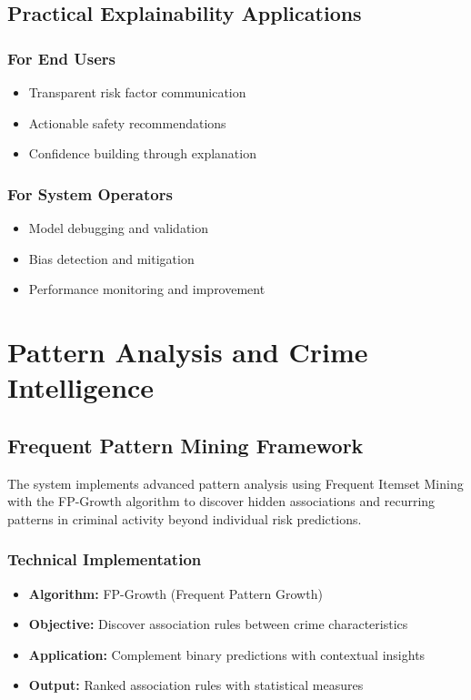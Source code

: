 \documentclass[11pt]{article}
\begin{document}
\subsection{Practical Explainability Applications}

\subsubsection{For End Users}
\begin{itemize}[leftmargin=*]
\item Transparent risk factor communication
\item Actionable safety recommendations
\item Confidence building through explanation
\end{itemize}

\subsubsection{For System Operators}
\begin{itemize}[leftmargin=*]
\item Model debugging and validation
\item Bias detection and mitigation
\item Performance monitoring and improvement
\end{itemize}

\section{Pattern Analysis and Crime Intelligence}

\subsection{Frequent Pattern Mining Framework}
The system implements advanced pattern analysis using Frequent Itemset Mining with the FP-Growth algorithm to discover hidden associations and recurring patterns in criminal activity beyond individual risk predictions.

\subsubsection{Technical Implementation}
\begin{itemize}[leftmargin=*]
\item \textbf{Algorithm:} FP-Growth (Frequent Pattern Growth)
\item \textbf{Objective:} Discover association rules between crime characteristics
\item \textbf{Application:} Complement binary predictions with contextual insights
\item \textbf{Output:} Ranked association rules with statistical measures
\end{itemize}
\end{document}

